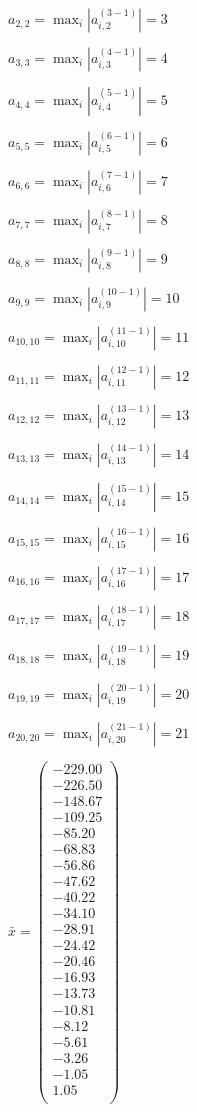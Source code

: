 \documentclass[a4paper,12pt]{article}
\begin{document}
$a _{ 2, 2 } =  \max _i |a _{ i, 2 } ^{ (3 - 1) } | = 3$

$a _{ 3, 3 } =  \max _i |a _{ i, 3 } ^{ (4 - 1) } | = 4$

$a _{ 4, 4 } =  \max _i |a _{ i, 4 } ^{ (5 - 1) } | = 5$

$a _{ 5, 5 } =  \max _i |a _{ i, 5 } ^{ (6 - 1) } | = 6$

$a _{ 6, 6 } =  \max _i |a _{ i, 6 } ^{ (7 - 1) } | = 7$

$a _{ 7, 7 } =  \max _i |a _{ i, 7 } ^{ (8 - 1) } | = 8$

$a _{ 8, 8 } =  \max _i |a _{ i, 8 } ^{ (9 - 1) } | = 9$

$a _{ 9, 9 } =  \max _i |a _{ i, 9 } ^{ (10 - 1) } | = 10$

$a _{ 10, 10 } =  \max _i |a _{ i, 10 } ^{ (11 - 1) } | = 11$

$a _{ 11, 11 } =  \max _i |a _{ i, 11 } ^{ (12 - 1) } | = 12$

$a _{ 12, 12 } =  \max _i |a _{ i, 12 } ^{ (13 - 1) } | = 13$

$a _{ 13, 13 } =  \max _i |a _{ i, 13 } ^{ (14 - 1) } | = 14$

$a _{ 14, 14 } =  \max _i |a _{ i, 14 } ^{ (15 - 1) } | = 15$

$a _{ 15, 15 } =  \max _i |a _{ i, 15 } ^{ (16 - 1) } | = 16$

$a _{ 16, 16 } =  \max _i |a _{ i, 16 } ^{ (17 - 1) } | = 17$

$a _{ 17, 17 } =  \max _i |a _{ i, 17 } ^{ (18 - 1) } | = 18$

$a _{ 18, 18 } =  \max _i |a _{ i, 18 } ^{ (19 - 1) } | = 19$

$a _{ 19, 19 } =  \max _i |a _{ i, 19 } ^{ (20 - 1) } | = 20$

$a _{ 20, 20 } =  \max _i |a _{ i, 20 } ^{ (21 - 1) } | = 21$

$\bar { x } = \begin{pmatrix}
-229.00 \\
-226.50 \\
-148.67 \\
-109.25 \\
-85.20 \\
-68.83 \\
-56.86 \\
-47.62 \\
-40.22 \\
-34.10 \\
-28.91 \\
-24.42 \\
-20.46 \\
-16.93 \\
-13.73 \\
-10.81 \\
-8.12 \\
-5.61 \\
-3.26 \\
-1.05 \\
1.05 \\
\end{pmatrix}
$
\end{document}

